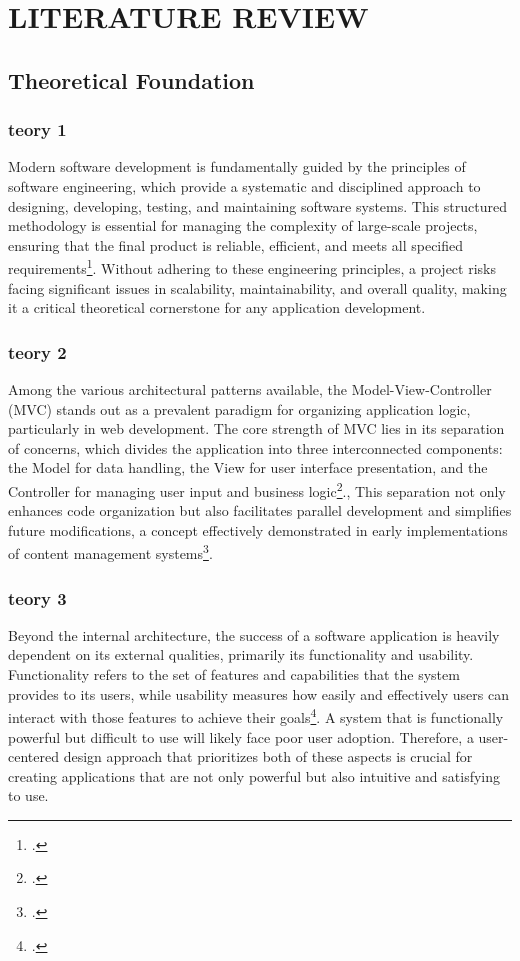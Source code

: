 \chapter{LITERATURE REVIEW}
	\section{Theoretical Foundation}
		\subsection{teory 1}
		\setlength{\leftskip}{1.4cm}
		Modern software development is fundamentally guided by the principles of software engineering, which provide a systematic and disciplined approach to designing, developing, testing, and maintaining software systems. This structured methodology is essential for managing the complexity of large-scale projects, ensuring that the final product is reliable, efficient, and meets all specified requirements\footcite{sommerville2016}. Without adhering to these engineering principles, a project risks facing significant issues in scalability, maintainability, and overall quality, making it a critical theoretical cornerstone for any application development.

		\subsection{teory 2}
		Among the various architectural patterns available, the Model-View-Controller (MVC) stands out as a prevalent paradigm for organizing application logic, particularly in web development. The core strength of MVC lies in its separation of concerns, which divides the application into three interconnected components: the Model for data handling, the View for user interface presentation, and the Controller for managing user input and business logic\footcite{majeed2018}., This separation not only enhances code organization but also facilitates parallel development and simplifies future modifications, a concept effectively demonstrated in early implementations of content management systems\footcite{kristoko2009}.
		
		\subsection{teory 3}
		Beyond the internal architecture, the success of a software application is heavily dependent on its external qualities, primarily its functionality and usability. Functionality refers to the set of features and capabilities that the system provides to its users, while usability measures how easily and effectively users can interact with those features to achieve their goals\footcite{goodwin1987}. A system that is functionally powerful but difficult to use will likely face poor user adoption. Therefore, a user-centered design approach that prioritizes both of these aspects is crucial for creating applications that are not only powerful but also intuitive and satisfying to use.
		
